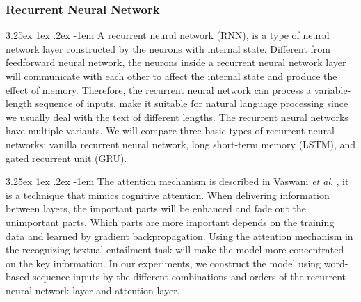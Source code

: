 \documentclass[12pt]{article}
\makeatletter
\renewcommand\paragraph{\@startsection{paragraph}{5}{\z@}%
  {3.25ex \@plus1ex \@minus.2ex}%
  {-1em}%
  {\normalfont\normalsize\bfseries}}
\makeatother
\begin{document}
\begin{CJK*}{UTF8}{bkai}
\begin{spacing}{1.77}
\subsubsection{Recurrent Neural Network} \label{section:rnn}
\paragraph{}
A recurrent neural network (RNN), is a type of neural network layer constructed by the neurons with internal state. Different from feedforward neural network, the neurons inside a recurrent neural network layer will communicate with each other to affect the internal state and produce the effect of memory. Therefore, the recurrent neural network can process a variable-length sequence of inputs, make it suitable for natural language processing since we usually deal with the text of different lengths. The recurrent neural networks have multiple variants. We will compare three basic types of recurrent neural networks: vanilla recurrent neural network, long short-term memory (LSTM), and gated recurrent unit (GRU).



\paragraph{}
The attention mechanism is described in Vaswani \emph{et al}. \cite{vaswani2017attention}, it is a technique that mimics cognitive attention. When delivering information between layers, the important parts will be enhanced and fade out the unimportant parts. Which parts are more important depends on the training data and learned by gradient backpropagation. Using the attention mechanism in the recognizing textual entailment task will make the model more concentrated on the key information. In our experiments, we construct the model using word-based sequence inputs by the different combinations and orders of the recurrent neural network layer and attention layer.


\end{spacing}
\end{CJK*}
\end{document}
